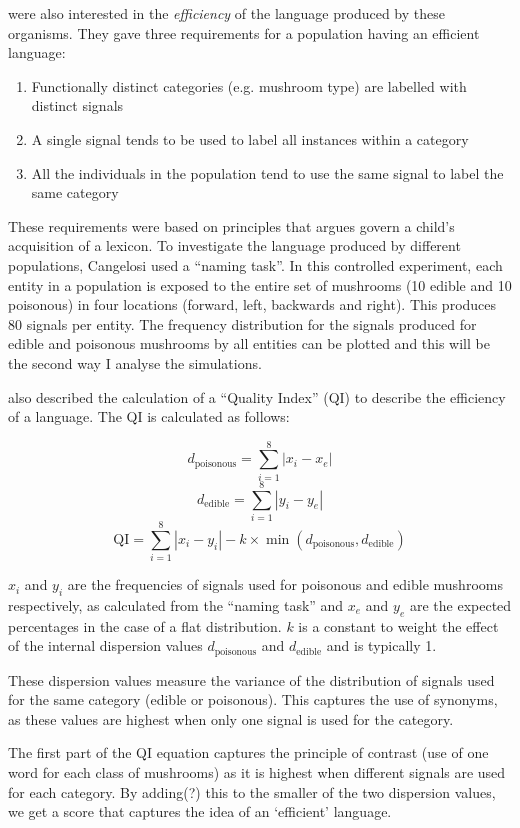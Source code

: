 \documentclass[12pt,a4paper,twoside,openright]{report}
\begin{document}
\cite{Cangelosi1998} were also interested in the \emph{efficiency} of the language produced by these organisms. They gave three requirements for a population having an efficient language:

\begin{enumerate}
	\item Functionally distinct categories (e.g. mushroom type) are labelled with distinct signals
	\item A single signal tends to be used to label all instances within a category
	\item All the individuals in the population tend to use the same signal to label the same category
\end{enumerate}

These requirements were based on principles that \cite{Clark1995} argues govern a child's acquisition of a lexicon. To investigate the language produced by different populations, Cangelosi used a ``naming task''. In this controlled experiment, each entity in a population is exposed to the entire set of mushrooms (10 edible and 10 poisonous) in four locations (forward, left, backwards and right). This produces 80 signals per entity. The frequency distribution for the signals produced for edible and poisonous mushrooms by all entities can be plotted and this will be the second way I analyse the simulations.

\citet{Cangelosi1998} also described the calculation of a ``Quality Index'' (QI) to describe the efficiency of a language. The QI is calculated as follows:

$$d_{\mathrm{poisonous}} = \sum^{8}_{i = 1}{|x_i - x_e|}$$
$$d_{\mathrm{edible}} = \sum^{8}_{i = 1}{|y_i - y_e|}$$
$$\mathrm{QI} = \sum^{8}_{i = 1} |x_i - y_i| - k \times \min (d_{\mathrm{poisonous}}, d_{\mathrm{edible}})$$

$x_i$ and $y_i$ are the frequencies of signals used for poisonous and edible mushrooms respectively, as calculated from the ``naming task'' and $x_e$ and $y_e$ are the expected percentages in the case of a flat distribution. $k$ is a constant to weight the effect of the internal dispersion values $d_{\mathrm{poisonous}}$ and $d_{\mathrm{edible}}$ and is typically 1.

These dispersion values measure the variance of the distribution of signals used for the same category (edible or poisonous). This captures the use of synonyms, as these values are highest when only one signal is used for the category. 

The first part of the QI equation captures the principle of contrast (use of one word for each class of mushrooms) as it is highest when different signals are used for each category. By adding(?) this to the smaller of the two dispersion values, we get a score that captures the idea of an `efficient' language.
\end{document}
